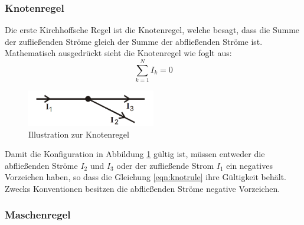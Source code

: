 \subsubsection{Knotenregel}
Die erste Kirchhoffsche Regel ist die Knotenregel, welche besagt, dass die Summe der zufließenden Ströme gleich der Summe der abfließenden Ströme ist.
Mathematisch ausgedrückt sieht die Knotenregel wie foglt aus:
\begin{equation}
    \sum_{k=1}^N I_k = 0 \label{eqn:knotrule}
\end{equation} 
\begin{figure}
    \centering
    \caption{Illustration zur Knotenregel}
    \label{fig:knotrule}
    \includegraphics[width = 0.5\textwidth]{bridges/knotrule.png}
\end{figure}
Damit die Konfiguration in Abbildung \ref{fig:knotrule} gültig ist, müssen entweder die abfließenden Ströme $I_2$ und $I_3$ oder 
der zufließende Strom $I_1$ ein negatives Vorzeichen haben, so dass die Gleichung \eqref{eqn:knotrule} ihre Gültigkeit 
behält. Zwecks Konventionen besitzen die abfließenden Ströme negative Vorzeichen.
\subsubsection{Maschenregel}